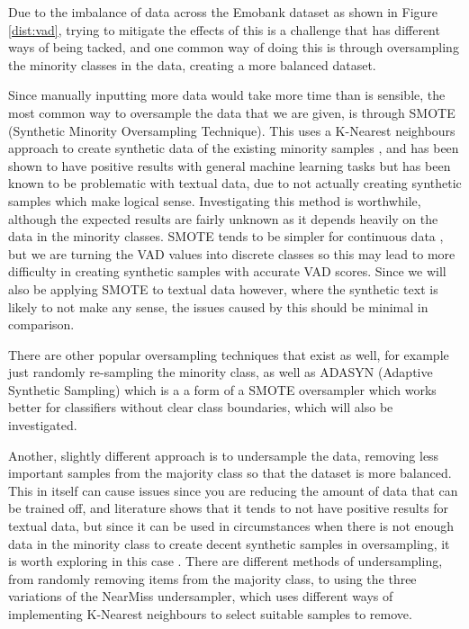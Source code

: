 Due to the imbalance of data across the Emobank dataset as shown in Figure \ref{dist:vad}, trying to mitigate the effects of this is a challenge that has different ways of being tacked, and one common way of doing this is through oversampling the minority classes in the data, creating a more balanced dataset. \cite{towardsDS}

Since manually inputting more data would take more time than is sensible, the most common way to oversample the data that we are given, is through SMOTE (Synthetic Minority Oversampling Technique). This uses a K-Nearest neighbours approach to create synthetic data of the existing minority samples , and has been shown to have positive results with general machine learning tasks but has been known to be problematic with textual data, due to not actually creating synthetic samples which make logical sense. Investigating this method is worthwhile, although the expected results are fairly unknown as it depends heavily on the data in the minority classes. SMOTE tends to be simpler for continuous data \cite{chawla2002smote}, but we are turning the VAD values into discrete classes so this may lead to more difficulty in creating synthetic samples with accurate VAD scores. Since we will also be applying SMOTE to textual data however, where the synthetic text is likely to not make any sense, the issues caused by this should be minimal in comparison. 

There are other popular oversampling techniques that exist as well, for example just randomly re-sampling the minority class, as well as ADASYN (Adaptive Synthetic Sampling) which is a a form of a SMOTE oversampler which works better for classifiers without clear class boundaries, which will also be investigated.

Another, slightly different approach is to undersample the data, removing less important samples from the majority class so that the dataset is more balanced. This in itself can cause issues since you are reducing the amount of data that can be trained off, and literature shows that it tends to not have positive results for textual data, but since it can be used in circumstances when there is not enough data in the minority class to create decent synthetic samples in oversampling, it is worth exploring in this case \cite{more2016survey}. There are different methods of undersampling, from randomly removing items from the majority class, to using the three variations of the NearMiss undersampler, which uses different ways of implementing K-Nearest neighbours to select suitable samples to remove. 

